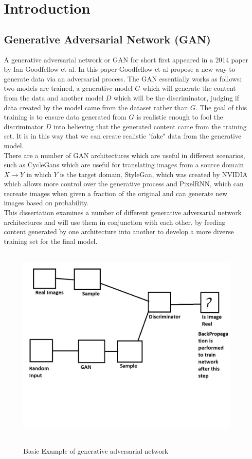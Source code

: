 \chapter{Introduction}

\section{Generative Adversarial Network (GAN)}
A generative adversarial network or GAN for short first appeared in a 2014 paper by Ian Goodfellow et al\cite{generativeAdversarialNetworks}.  In this paper Goodfellow et al propose a new way to generate data via an adversarial process.  The GAN essentially works as follows: two models are trained, a generative model $G$ which will generate the content from the data and another model $D$ which will be the discriminator, judging if data created by the model came from the dataset rather than $G$.  The goal of this training is to ensure data generated from $G$ is realistic enough to fool the discriminator $D$ into believing that the generated content came from the training set.  It  is in this way that we can create realistic "fake" data from the generative model.
\\
There are a number of GAN architectures which are useful in different scenarios, such as CycleGans\cite{cycleGan} which are useful for translating images from a source domain $X \rightarrow Y$ in which $Y$ is the target domain, StyleGan, which was created by NVIDIA which allows more control over the generative process\cite{styleGan} and PixelRNN, which can recreate images when given a fraction of the original and can generate new images based on probability\cite{pixelRnn}. 
\\
This dissertation examines a number of different generative adversarial network architectures and will use them in conjunction with each other, by feeding content generated by one architecture into another to develop a more diverse training set for the final model.
\vspace{0.5mm}
\begin{figure}[H]
    \centering
    \includegraphics[width=1\textwidth,height=10cm]{Images/GAN Basic.jpg}\\
    \caption{Basic Example of generative adversarial network}
    \label{fig:ExampleGAN}
\end{figure}
